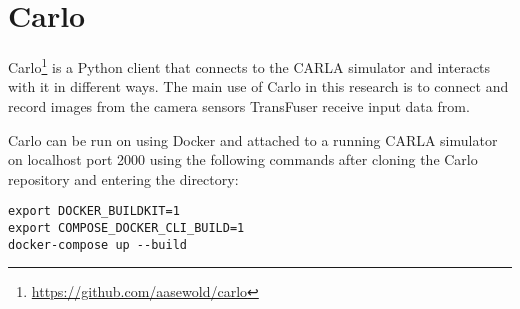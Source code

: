 \section{Carlo}
\label{app:instructions:carlo}

Carlo\footnote{\url{https://github.com/aasewold/carlo}}
is a Python client that connects to the CARLA simulator
and interacts with it in different ways.
The main use of Carlo in this research is to connect and record images
from the camera sensors TransFuser receive input data from.

Carlo can be run on \nap using Docker
and attached to a running CARLA simulator on localhost port 2000 using the following commands after cloning the Carlo repository and entering the directory:
\begin{lstlisting}
export DOCKER_BUILDKIT=1
export COMPOSE_DOCKER_CLI_BUILD=1
docker-compose up --build
\end{lstlisting}